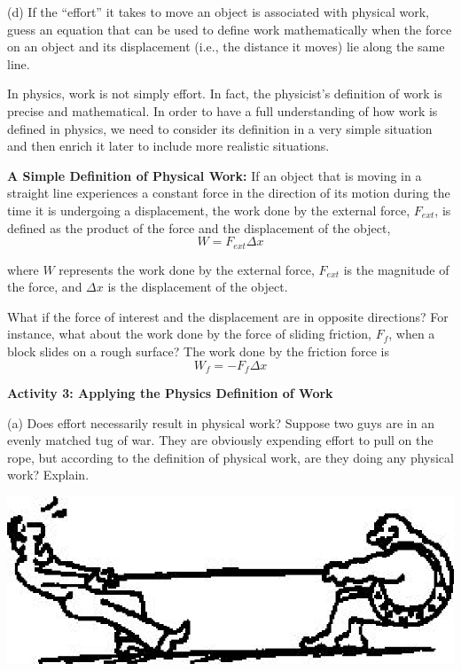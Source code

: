 (d) If the ``effort'' it takes to move an object is associated
with physical work, guess an equation that can be used to define work mathematically
when the force on an object and its displacement (i.e., the distance it moves)
lie along the same line.
\vspace{20mm}

In physics, work is not simply effort. In fact, the physicist's definition of
work is precise and mathematical. In order to have a full understanding of how
work is defined in physics, we need to consider its definition in a very simple
situation and then enrich it later to include more realistic situations.

\textbf{A Simple Definition of Physical Work:} If an object that is moving in
a straight line experiences a constant force in the direction of its motion
during the time it is undergoing a displacement, the work done by the external
force, \( F_{ext} \), is defined as the product of the force and the displacement of the object, 
\[
W=F_{ext}\Delta x\]


where $W$ represents the work done by the external force, \( F_{ext} \) is the
magnitude of the force, and \( \Delta  x\) is the displacement of the object.

What if the force of interest and the displacement are in opposite directions? For instance, what about the work done by the force of sliding friction,
\( F_{f} \), when a block slides on a rough surface? The work done by the friction force is
\[
W_{f}=-F_{f}\Delta x\]

\textbf{Activity 3: Applying the Physics Definition of Work} 

(a) Does effort necessarily result in physical work? Suppose two guys are in
an evenly matched tug of war. They are obviously expending effort to pull on the
rope, but according to the definition of physical work, are they doing any physical
work? Explain.

\vspace{0.3cm}
{\par\centering \includegraphics{work_power_fig3.eps} \par}
\vspace{0.3cm}

